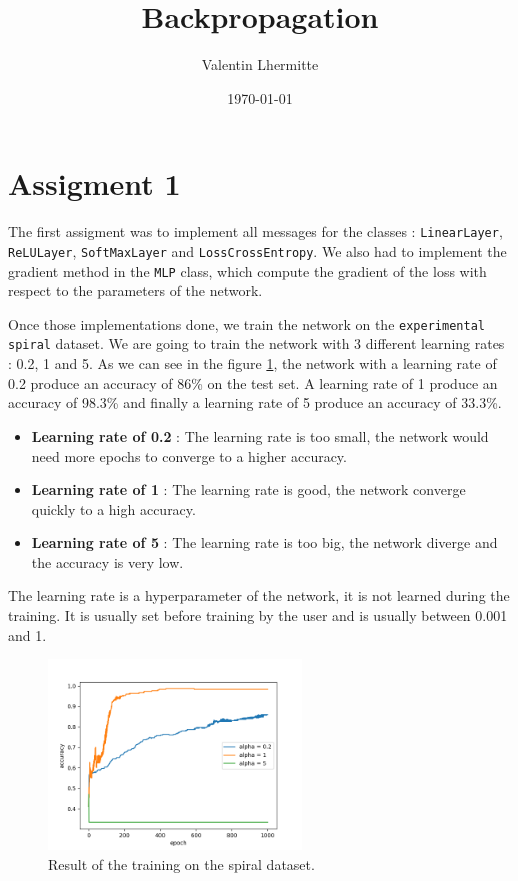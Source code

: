 \documentclass{article}
\begin{document}
\title{Backpropagation}
\author{Valentin Lhermitte}
\date{\today}

\maketitle

\section{Assigment 1}

The first assigment was to implement all messages for the classes : \texttt{LinearLayer}, \texttt{ReLULayer}, \texttt{SoftMaxLayer} and \texttt{LossCrossEntropy}. 
We also had to implement the gradient method in the \texttt{MLP} class, which compute the gradient of the loss with respect to the parameters of the network. 

Once those implementations done, we train the network on the \texttt{experimental spiral} dataset.
We are going to train the network with 3 different learning rates : 0.2, 1 and 5.
As we can see in the figure \ref{fig:spiral}, the network with a learning rate of 0.2 produce an accuracy of 86\% on the test set.
A learning rate of 1 produce an accuracy of 98.3\% and finally a learning rate of 5 produce an accuracy of 33.3\%.

\begin{itemize}
    \item \textbf{Learning rate of 0.2} : The learning rate is too small, the network would need more epochs to converge to a higher accuracy.
    \item \textbf{Learning rate of 1} : The learning rate is good, the network converge quickly to a high accuracy.
    \item \textbf{Learning rate of 5} : The learning rate is too big, the network diverge and the accuracy is very low.
\end{itemize}

The learning rate is a hyperparameter of the network, it is not learned during the training. It is usually set before training by the user and is usually between 0.001 and 1.

\begin{figure}[h]
    \centering
    \includegraphics[width=0.6\textwidth]{images/Figure_4.png}
    \caption{Result of the training on the spiral dataset.}
    \label{fig:spiral}
\end{figure}
\end{document}
